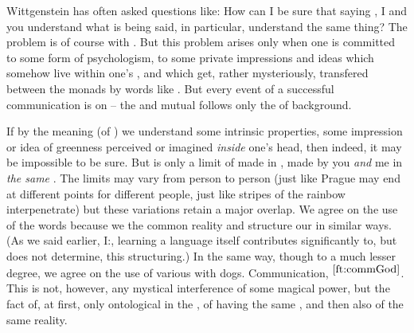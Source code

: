 \pa Wittgenstein has often asked questions like: How can I be sure that
saying , I and you understand what is being said, in particular,
understand the same thing? The problem is of course with . But
this problem arises only when one is committed to some form of psychologism, to
some private impressions and ideas which somehow live within one's
, and which get, rather mysteriously, transfered between the
monads by words like .  But every event of a successful communication
is  on  -- the  and mutual
 follows only the  of  background.

If by the meaning (of ) we understand some intrinsic properties, some
impression or idea of greenness perceived or imagined {\em inside} one's head,
then indeed, it may be impossible to be sure.  But  is only a
limit of  made in , made by you {\em and} me in {\em
the same} . The limits may vary from person to person (just like Prague
may end at different points for different people, just like stripes of the
rainbow interpenetrate) but these variations retain a major
overlap. We agree on the use of the words because we  the common
reality and structure our  in similar ways. (As we said earlier,
I:, learning a language itself contributes
significantly to, but does not determine, this structuring.) In the same way,
though to a much lesser degree, we agree on the use of various  with
dogs.  Communication, $^{\ref{ft:commGod}}$. This  is not, however, any mystical
interference of some magical power, but the fact of, at first, only ontological
 in the , of having the same , and then also
of  the same reality.


